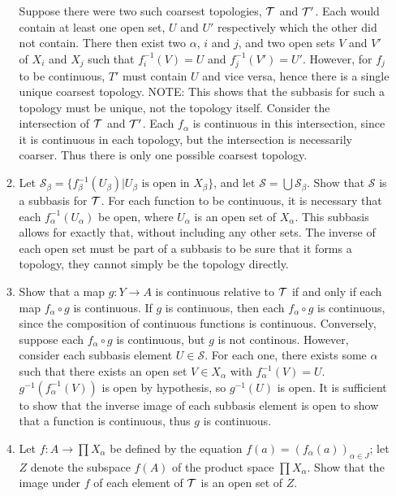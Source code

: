 \documentclass[12pt,letterpaper]{article}
\begin{document}
\begin{enumerate}
\begin{enumerate}
    \indent Suppose there were two such coarsest topologies, $\mathcal{T}$ and $\mathcal{T}'$. Each would contain at least one open set, $U$ and $U'$ respectively which the other did not contain. There then exist two $\alpha$, $i$ and $j$, and two open sets $V$ and $V'$ of $X_i$ and $X_j$ such that $f_i^{-1}(V)=U$ and $f_j^{-1}(V')=U'$. However, for $f_j$ to be continuous, $T'$ must contain $U$ and vice versa, hence there is a single unique coarsest topology. NOTE: This shows that the subbasis for such a topology must be unique, not the topology itself. \n
    \indent Consider the intersection of $\mathcal{T}$ and $\mathcal{T}'$. Each $f_\alpha$ is continuous in this intersection, since it is continuous in each topology, but the intersection is necessarily coarser. Thus there is only one possible coarsest topology. 
    \item Let $\mathcal{S}_\beta=\{f_\beta^{-1}(U_\beta) | U_\beta \text{ is open in } X_\beta\}$, and let $\mathcal{S}=\bigcup \mathcal{S}_\beta$. Show that $\mathcal{S}$ is a subbasis for $\mathcal{T}$.\hspace{5in}\n
    \indent For each function to be continuous, it is necessary that each $f_\alpha^{-1}(U_\alpha)$ be open, where $U_\alpha$ is an open set of $X_\alpha$. This subbasis allows for exactly that, without including any other sets. The inverse of each open set must be part of a subbasis to be sure that it forms a topology, they cannot simply be the topology directly.
    \item Show that a map $g: Y\rightarrow A$ is continuous relative to $\mathcal{T}$ if and only if each map $f_\alpha \circ g$ is continuous.\hspace{5in}\n
    \indent If $g$ is continuous, then each $f_\alpha \circ g$ is continuous, since the composition of continuous functions is continuous. Conversely, suppose each $f_\alpha \circ g$ is continuous, but $g$ is not continous. %
    However, consider each subbasis element $U\in\mathcal{S}$. For each one, there exists some $\alpha$ such that there exists an open set $V\in X_\alpha$ with $f_\alpha^{-1}(V)=U$. $g^{-1}(f^{-1}_\alpha(V))$ is open by hypothesis, so $g^{-1}(U)$ is open. It is sufficient to show that the inverse image of each subbasis element is open to show that a function is continuous, thus $g$ is continuous.
    \item Let $f: A\rightarrow \prod X_\alpha$ be defined by the equation $f(a) = (f_\alpha(a))_{\alpha\in J}$; let $Z$ denote the subspace $f(A)$ of the product space $\prod X_\alpha$. Show that the image under $f$ of each element of $\mathcal{T}$ is an open set of $Z$. \hspace{5in}\n

\end{enumerate}
\end{enumerate}
\end{document}
